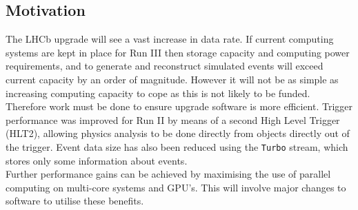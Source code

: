 \subsection{Motivation}
The LHCb upgrade will see a vast increase in data rate. If current computing systems are kept in place for Run III then storage capacity and computing power requirements, and to generate and reconstruct simulated events will exceed current capacity by an order of magnitude\cite{Bozzi:2298181}. However it will not be as simple as increasing computing capacity to cope as this is not likely to be funded. Therefore work must be done to ensure upgrade software is more efficient. Trigger performance was improved for Run II by means of a second High Level Trigger (HLT2), allowing physics analysis to be done directly from objects directly out of the trigger. Event data size has also been reduced using the \verb|Turbo| stream, which stores only some information about events.\\
Further performance gains can be achieved by maximising the use of parallel computing on multi-core systems and GPU's. This will involve major changes to software to utilise these benefits.


